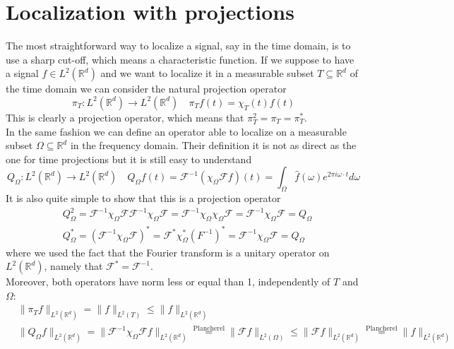 \documentclass[corpo=11pt, stile=classica, tipotesi=custom,
greek, evenboxes, english]{toptesi}
\numberwithin{equation}{chapter}
\newcommand{\R}{\mathbb{R}} %
\newcommand{\F}{\mathcal{F}} %
\begin{document}
\section{Localization with projections}
The most straightforward way to localize a signal, say in the time domain, is to use a sharp cut-off, which means a characteristic function. If we suppose to have a signal $f \in L^2(\R^d)$ and we want to localize it in a measurable subset $T \subseteq \R^d$ of the time domain we can consider the natural projection operator
\begin{equation}\label{time projection operator}
	\pi_T : L^2(\R^d) \rightarrow L^2(\R^d) \quad \pi_T f(t) = \chi_T(t) f(t)
\end{equation}
This is clearly a projection operator, which means that $\pi_T^2 = \pi_T = \pi_T^*$.\\
In the same fashion we can define an operator able to localize on a measurable subset $\Omega \subseteq \R^d$ in the frequency domain. Their definition it is not as direct as the one for time projections but it is still easy to understand
\begin{equation}\label{frequency projection operator}
	Q_{\Omega} : L^2(\R^d) \rightarrow L^2(\R^d) \quad Q_{\Omega} f(t) = \F^{-1} \left(\chi_{\Omega} \F f \right)(t) = \int_{\Omega} \hat{f}(\omega) e^{2 \pi i \omega \cdot t} d\omega
\end{equation}
It is also quite simple to show that this is a projection operator
\begin{align*}
	&Q_{\Omega}^2 = \F^{-1} \chi_{\Omega} \F \F^{-1} \chi_{\Omega} \F = \F^{-1} \chi_{\Omega} \chi_{\Omega} \F = \F^{-1} \chi_{\Omega} \F = Q_{\Omega}\\
	&Q_{\Omega}^* = \left( \F^{-1} \chi_{\Omega} \F\right)^* = \F^* \chi_{\Omega}^* \left(F^{-1}\right)^* = \F^{-1} \chi_{\Omega} \F = Q_{\Omega}
\end{align*}
where we used the fact that the Fourier transform is a unitary operator on $L^2(\R^d)$, namely that $\F^* = \F^{-1}$.\\
Moreover, both operators have norm less or equal than 1, independently of $T$ and $\Omega$:
\begin{align*}
	&\| \pi_T f \|_{L^2(\R^d)} = \| f \|_{L^2(T)} \leq \| f \|_{L^2(\R^d)} \\
	&\| Q_{\Omega} f \|_{L^2(\R^d)} = \| \F^{-1} \chi_{\Omega} \F f\|_{L^2(\R^d)} \overset{\text{Plancherel}}{=} \| \F f\|_{L^2(\Omega)} \leq \| \F f \|_{L^2(\R^d)} \overset{\text{Plancherel}}{=} \| f \|_{L^2(\R^d)}
\end{align*}
\end{document}
